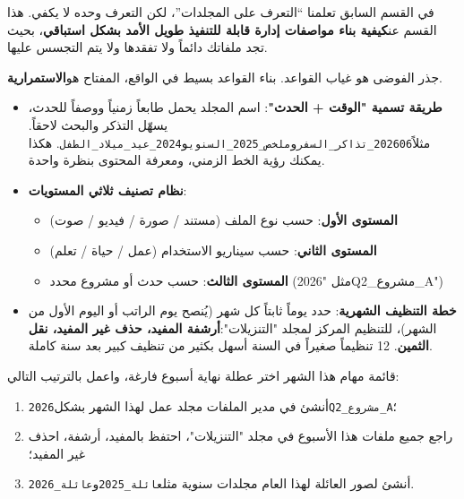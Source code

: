 
في القسم السابق تعلمنا “التعرف على المجلدات”، لكن التعرف وحده لا يكفي. هذا القسم عن\textbf{كيفية بناء مواصفات إدارة قابلة للتنفيذ طويل الأمد بشكل استباقي}، بحيث تجد ملفاتك دائماً ولا تفقدها ولا يتم التجسس عليها.


جذر الفوضى هو غياب القواعد. بناء القواعد بسيط في الواقع، المفتاح هو\textbf{الاستمرارية}.

\begin{itemize}
  \item \textbf{طريقة تسمية "الوقت + الحدث"}: اسم المجلد يحمل طابعاً زمنياً ووصفاً للحدث، يسهّل التذكر والبحث لاحقاً. مثلاً\texttt{202606\_تذاكر\_السفر}و\texttt{ملخص\_2025\_السنوي}و\texttt{2024\_عيد\_ميلاد\_الطفل}. هكذا يمكنك رؤية الخط الزمني، ومعرفة المحتوى بنظرة واحدة.
  \item \textbf{نظام تصنيف ثلاثي المستويات}:
  \begin{itemize}
    \item \textbf{المستوى الأول}: حسب نوع الملف (مستند / صورة / فيديو / صوت)
    \item \textbf{المستوى الثاني}: حسب سيناريو الاستخدام (عمل / حياة / تعلم)
    \item \textbf{المستوى الثالث}: حسب حدث أو مشروع محدد (مثل "2026Q2\_مشروع\_A")
  \end{itemize}
  \item \textbf{خطة التنظيف الشهرية}: حدد يوماً ثابتاً كل شهر (يُنصح يوم الراتب أو اليوم الأول من الشهر)، للتنظيم المركز لمجلد "التنزيلات":\textbf{أرشفة المفيد، حذف غير المفيد، نقل الثمين}. 12 تنظيماً صغيراً في السنة أسهل بكثير من تنظيف كبير بعد سنة كاملة.
\end{itemize}

\begin{tcbpractice}{قائمة مهام هذا الشهر}
اختر عطلة نهاية أسبوع فارغة، واعمل بالترتيب التالي:

\begin{enumerate}
  \item أنشئ في مدير الملفات مجلد عمل لهذا الشهر بشكل\texttt{2026Q2\_مشروع\_A}؛
  \item راجع جميع ملفات هذا الأسبوع في مجلد "التنزيلات"، احتفظ بالمفيد، أرشفة، احذف غير المفيد؛
  \item أنشئ لصور العائلة لهذا العام مجلدات سنوية مثل\texttt{عائلة\_2025}و\texttt{عائلة\_2026}.
\end{enumerate}

\end{tcbpractice}

